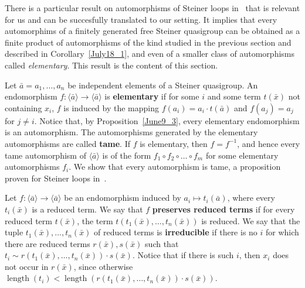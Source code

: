 \documentclass[a4paper, 11pt]{article}
\DeclareMathOperator{\len}{length}
\theoremstyle{note}
\begin{document}
There is a particular result on automorphisms of Steiner loops in~\cite{grishkovetal} that is relevant for us and can be succesfully translated to our setting. It implies that every automorphims of a finitely generated free Steiner quasigroup can be obtained as a finite product of automorphisms of the kind studied in the previous section and described in Corollary~\ref{July18_1}, and even of a smaller class of automorphisms called \textit{elementary}. This result is the content of this section.

Let $\bar{a}= a_1,\ldots,a_n$  be independent elements of a Steiner quasigroup. An endomorphism $f:\langle\bar{a}\rangle\rightarrow \langle\bar{a}\rangle$ is {\bf elementary} if for some $i$ and some term $t(\bar{x})$ not containing $x_i$, $f$ is induced  by the mapping  $f(a_i)= a_i\cdot t(\bar{a})$  and $f(a_j)= a_j$ for $j\neq i$. Notice that, by  Proposition~\ref{June9_3}, every elementary endomorphism is an automorphism.  The automorphisms generated by the elementary automorphisms are called {\bf tame}. If $f$ is elementary, then $f=f^{-1}$, and hence every tame automorphism of $\langle \bar{a}\rangle$ is of the form $f_1\circ f_2\circ \ldots \circ f_m$  for some elementary automorphisms $f_i$. We show that every automorphism is tame, a proposition proven for Steiner loops in~\cite{grishkovetal}.

Let  $f:\langle \bar{a}\rangle\rightarrow\langle \bar{a}\rangle $ be an endomorphism induced by $a_i\mapsto t_i(\bar{a})$, where every $t_i(\bar{x})$ is a reduced term. We say that $f$ {\bf preserves reduced terms} if for every reduced term $t(\bar{x})$, the term  $t(t_1(\bar{x}),\ldots,t_n(\bar{x}))$ is reduced. We say that the tuple $t_1(\bar{x}),\ldots,t_n(\bar{x})$ of reduced terms is {\bf irreducible} if  there is no $i$ for which there are reduced terms $r(\bar{x}), s(\bar{x})$  such that  $t_i\sim r(t_1(\bar{x}),\ldots,t_n(\bar{x}))\cdot s(\bar{x})$. Notice that if there is such $i$, then $x_i$ does not occur in $r(\bar{x})$, since otherwise $\len(t_i)<\len(r(t_1(\bar{x}),\ldots,t_n(\bar{x}))\cdot s(\bar{x}))$.
\end{document}
